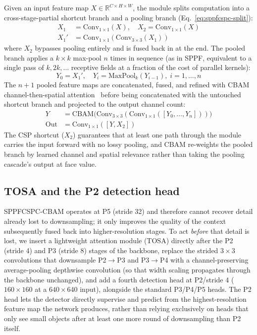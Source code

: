 \documentclass[conference]{IEEEtran}
\begin{document}
Given an input feature map $X \in \mathbb{R}^{C \times H \times W}$, the
module splits computation into a cross-stage-partial shortcut branch and a
pooling branch (Eq.~\ref{eq:sppfcspc-split}):
\begin{align}
\label{eq:sppfcspc-split}
X_1 &= \mathrm{Conv}_{1\times1}(X), \quad X_2 = \mathrm{Conv}_{1\times1}(X) \\
X_1' &= \mathrm{Conv}_{1\times1}(\mathrm{Conv}_{3\times3}(X_1))
\end{align}
where $X_2$ bypasses pooling entirely and is fused back in at the end. The
pooled branch applies a $k\times k$ max-pool $n$ times in sequence (as in
SPPF, equivalent to a single pass of $k, 2k, \dots$ receptive fields at a
fraction of the cost of parallel kernels):
\begin{equation}
Y_0 = X_1', \quad Y_i = \mathrm{MaxPool}_{k}(Y_{i-1}), \; i = 1, \dots, n
\end{equation}
The $n+1$ pooled feature maps are concatenated, fused, and refined with
CBAM channel-then-spatial attention~\cite{woo2018cbam} before being
concatenated with the untouched shortcut branch and projected to the
output channel count:
\begin{align}
Y &= \mathrm{CBAM}\big(\mathrm{Conv}_{3\times3}(\mathrm{Conv}_{1\times1}([Y_0, \dots, Y_n]))\big) \\
\mathrm{Out} &= \mathrm{Conv}_{1\times1}([Y, X_2])
\end{align}
The CSP shortcut ($X_2$) guarantees that at least one path through the
module carries the input forward with no lossy pooling, and CBAM
re-weights the pooled branch by learned channel and spatial relevance
rather than taking the pooling cascade's output at face value.

\subsection{TOSA and the P2 detection head}
\label{sec:method-tosa}

SPPFCSPC-CBAM operates at P5 (stride 32) and therefore cannot recover
detail already lost to downsampling; it only improves the quality of the
context subsequently fused back into higher-resolution stages. To act
\emph{before} that detail is lost, we insert a lightweight attention
module (TOSA) directly after the P2 (stride 4) and P3 (stride 8) stages of
the backbone, replace the strided $3\times3$ convolutions that downsample
P2$\to$P3 and P3$\to$P4 with a channel-preserving average-pooling depthwise
convolution (so that width scaling propagates through the backbone
unchanged), and add a fourth detection head at P2/stride 4 ($160\times160$
at a $640\times640$ input), alongside the standard P3/P4/P5 heads. The P2
head lets the detector directly supervise and predict from the
highest-resolution feature map the network produces, rather than relying
exclusively on heads that only see small objects after at least one more
round of downsampling than P2 itself.
\end{document}
